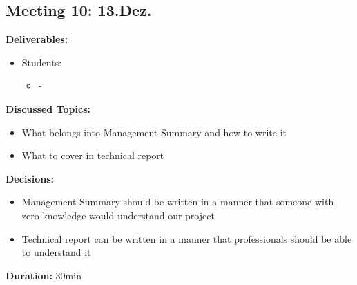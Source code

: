 \subsection*{Meeting 10: 13.Dez.}
\textbf{Deliverables:}
\begin{itemize}
    \item Students:
    \begin{itemize}
        \item -
    \end{itemize}
\end{itemize} 
\textbf{Discussed Topics:}
\begin{itemize}
    \item What belongs into Management-Summary and how to write it
    \item What to cover in technical report
\end{itemize}
\textbf{Decisions:}
\begin{itemize}
    \item Management-Summary should be written in a manner that someone with zero knowledge would understand our project
    \item Technical report can be written in a manner that professionals should be able to understand it
\end{itemize}
\textbf{Duration:} 30min

